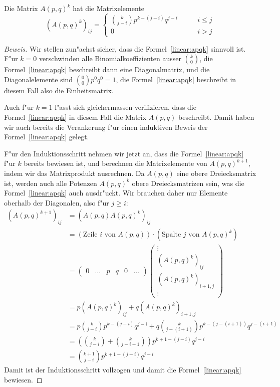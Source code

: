 \begin{satz}
\label{linear:apq}
Die Matrix $A(p,q)^k$ hat die Matrixelemente
\begin{equation}
(A(p,q)^k)_{ij}
=\begin{cases}
\binom{k}{j-i}p^{k-(j-i)}q^{j-i} &\qquad i\le j\\
0                                &\qquad i>j
\end{cases}
\label{linear:apqk}
\end{equation}
\end{satz}

\begin{proof}[Beweis]
Wir stellen zun"achst sicher, dass die Formel~\ref{linear:apqk} sinnvoll ist.
F"ur $k=0$ verschwinden alle Binomialkoeffizienten ausser $\binom{k}{0}$,
die Formel~\ref{linear:apqk} beschreibt dann eine Diagonalmatrix, und
die Diagonalelemente sind $\binom{0}{0}p^0q^0=1$, die Formel~\ref{linear:apqk}
beschreibt in diesem Fall also die Einheitsmatrix.

Auch f"ur $k=1$ l"asst sich gleichermassen verifizieren, dass die
Formel~\ref{linear:apqk} in diesem Fall die Matrix $A(p,q)$ beschreibt.
Damit haben wir auch bereits die Verankerung f"ur einen induktiven
Beweis der Formel~\ref{linear:apqk} gelegt.

F"ur den Induktionsschritt nehmen wir jetzt an, dass die
Formel~\ref{linear:apqk} f"ur $k$ bereits bewiesen ist, und berechnen
die Matrixelemente von $A(p,q)^{k+1}$, indem wir das Matrixprodukt
ausrechnen.
Da $A(p,q)$ eine obere Dreiecksmatrix ist, werden auch alle Potenzen
$A(p,q)^k$ obere Dreiecksmatrizen sein, was die Formel~\ref{linear:apqk}
auch ausdr"uckt.
Wir brauchen daher nur Elemente oberhalb der Diagonalen, also f"ur $j\ge i$:
\begin{align*}
(A(p,q)^{k+1})_{ij}
&=
(A(p,q)A(p,q)^k)_{ij}
\\
&=
(\text{Zeile $i$ von $A(p,q)$})
\cdot
(\text{Spalte $j$ von $A(p,q)^k$})
\\
&=
\begin{pmatrix}
0&\dots&p&q&0&\dots
\end{pmatrix}
\begin{pmatrix}
\vdots\\
(A(p,q)^k)_{ij}\\
(A(p,q)^k)_{i+1,j}\\
\vdots
\end{pmatrix}
\\
&=
p(A(p,q)^k)_{ij}
+
q(A(p,q)^k)_{i+1,j}
\\
&=
p\binom{k}{j-i}p^{k-(j-i)}q^{j-i}
+
q\binom{k}{j-(i+1)}p^{k-(j-(i+1))}q^{j-(i+1)}
\\
&=
\left(\binom{k}{j-i}+\binom{k}{j-i-1}\right) p^{k+1-(j-i)}q^{j-i}
\\
&=
\binom{k+1}{j-i} p^{k+1-(j-i)}q^{j-i}
\end{align*}
Damit ist der Induktionsschritt vollzogen und damit die
Formel~\ref{linear:apqk} bewiesen.
\end{proof}

